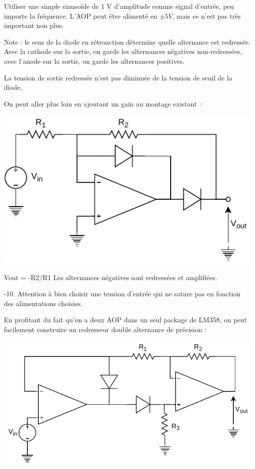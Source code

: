 \documentclass{../template/labo}
\begin{document}
{
Utiliser une simple sinusoïde de 1 V d'amplitude comme signal d'entrée, peu importe la fréquence.
L'AOP peut être alimenté en $\pm5 V$, mais ce n'est pas très important non plus.

Note : le sens de la diode en rétroaction détermine quelle alternance est redressée. Avec la cathode sur la sortie, on garde les alternances négatives non-redressées, avec l'anode sur la sortie, on garde les alternances positives.
}

{
La tension de sortie redressée n'est pas diminuée de la tension de seuil de la diode.
}


On peut aller plus loin en ajoutant un gain au montage existant~:
\begin{center}
	\includegraphics[width=.7\textwidth]{precision-rectifier-gain.pdf}
\end{center}

{
Vout = -R2/R1
Les alternances négatives sont redressées et amplifiées.
}

{
-10.
Attention à bien choisir une tension d'entrée qui ne sature pas en fonction des alimentations choisies.
}

En profitant du fait qu'on a deux AOP dans un seul package de LM358, on peut facilement construire un redresseur double alternance de précision :
\begin{center}
	\includegraphics[width=.7\textwidth]{precision-rectifier-double.pdf}
\end{center}
\end{document}
